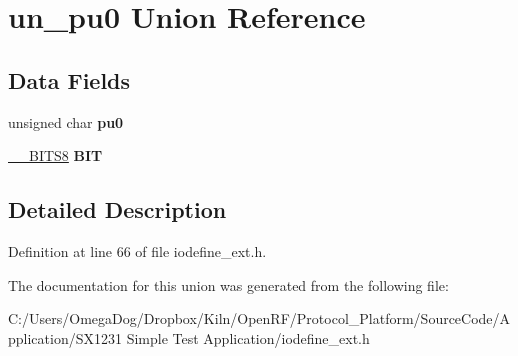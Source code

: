 \hypertarget{unionun__pu0}{\section{un\-\_\-pu0 Union Reference}
\label{unionun__pu0}
}
\subsection*{Data Fields}
\begin{DoxyCompactItemize}
\item 
\hypertarget{unionun__pu0_ab177984254c2717f6fc25eb09d31187d}{unsigned char {\bfseries pu0}}\label{unionun__pu0_ab177984254c2717f6fc25eb09d31187d}

\item 
\hypertarget{unionun__pu0_ae631ccf1ed4317e0444f393f9590a67e}{\hyperlink{struct_____b_i_t_s8}{\-\_\-\-\_\-\-B\-I\-T\-S8} {\bfseries B\-I\-T}}\label{unionun__pu0_ae631ccf1ed4317e0444f393f9590a67e}

\end{DoxyCompactItemize}


\subsection{Detailed Description}


Definition at line 66 of file iodefine\-\_\-ext.\-h.



The documentation for this union was generated from the following file\-:\begin{DoxyCompactItemize}
\item 
C\-:/\-Users/\-Omega\-Dog/\-Dropbox/\-Kiln/\-Open\-R\-F/\-Protocol\-\_\-\-Platform/\-Source\-Code/\-Application/\-S\-X1231 Simple Test Application/iodefine\-\_\-ext.\-h\end{DoxyCompactItemize}
